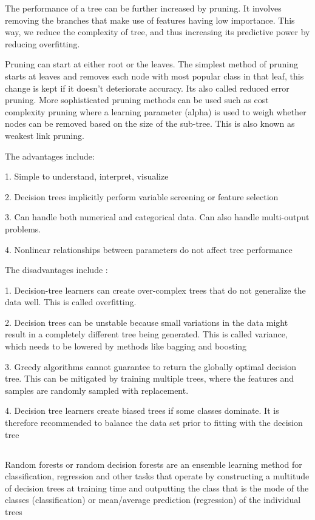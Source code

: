 \documentclass[12pt]{article}
\newcommand{\msize}{\fontsize{14pt}{12pt}\selectfont}
\begin{document}
The performance of a tree can be further increased by pruning. It involves removing the branches that make use of features having low importance. This way, we reduce the complexity of tree, and thus increasing its predictive power by reducing overfitting.

Pruning can start at either root or the leaves. The simplest method of pruning starts at leaves and removes each node with most popular class in that leaf, this change is kept if it doesn't deteriorate accuracy. Its also called reduced error pruning. More sophisticated pruning methods can be used such as cost complexity pruning where a learning parameter (alpha) is used to weigh whether nodes can be removed based on the size of the sub-tree. This is also known as weakest link pruning.

The advantages include: 

1. Simple to understand, interpret, visualize

2. Decision trees implicitly perform variable screening or feature selection

3. Can handle both numerical and categorical data. Can also handle multi-output problems.

4. Nonlinear relationships between parameters do not affect tree performance

The disadvantages include : 

1. Decision-tree learners can create over-complex trees that do not generalize the data well. This is called overfitting.

2. Decision trees can be unstable because small variations in the data might result in a completely different tree being generated. This is called variance, which needs to be lowered by methods like bagging and boosting

3. Greedy algorithms cannot guarantee to return the globally optimal decision tree. This can be mitigated by training multiple trees, where the features and samples are randomly sampled with replacement.

4. Decision tree learners create biased trees if some classes dominate. It is therefore recommended to balance the data set prior to fitting with the decision tree
\newpage 

\subsection{\msize{\textbf{RANDOM FOREST CLASSIFIER}}}
Random forests or random decision forests are an ensemble learning method for classification, regression and other tasks that operate by constructing a multitude of decision trees at training time and outputting the class that is the mode of the classes (classification) or mean/average prediction (regression) of the individual trees
\end{document}
